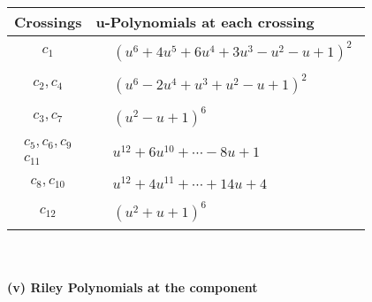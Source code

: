 \documentclass[1p]{elsarticle_modified}
\theoremstyle{definition}
\begin{document}
\begin{tabular}{m{50pt}|m{274pt}}
Crossings & \hspace{64pt}u-Polynomials at each crossing \\
\hline $$\begin{aligned}c_{1}\end{aligned}$$&$\begin{aligned}
&(u^6+4 u^5+6 u^4+3 u^3- u^2- u+1)^2
\end{aligned}$\\
\hline $$\begin{aligned}c_{2},c_{4}\end{aligned}$$&$\begin{aligned}
&(u^6-2 u^4+u^3+u^2- u+1)^2
\end{aligned}$\\
\hline $$\begin{aligned}c_{3},c_{7}\end{aligned}$$&$\begin{aligned}
&(u^2- u+1)^6
\end{aligned}$\\
\hline $$\begin{aligned}c_{5},c_{6},c_{9}\\c_{11}\end{aligned}$$&$\begin{aligned}
&u^{12}+6 u^{10}+\cdots-8 u+1
\end{aligned}$\\
\hline $$\begin{aligned}c_{8},c_{10}\end{aligned}$$&$\begin{aligned}
&u^{12}+4 u^{11}+\cdots+14 u+4
\end{aligned}$\\
\hline $$\begin{aligned}c_{12}\end{aligned}$$&$\begin{aligned}
&(u^2+u+1)^6
\end{aligned}$\\
\hline
\end{tabular}\\~\\
\newpage\renewcommand{\arraystretch}{1}
\flushleft \textbf{(v) Riley Polynomials at the component}\newline \\
\end{document}
